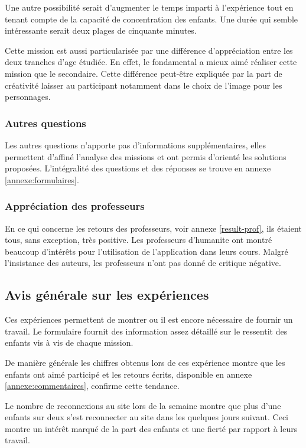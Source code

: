 Une autre possibilité serait d'augmenter le temps imparti à l'expérience tout en tenant compte de la capacité de concentration des enfants. Une durée qui semble intéressante serait deux plages de cinquante minutes.

Cette \gls{mission} est aussi particularisée par une différence d'appréciation entre les deux tranches d'age étudiée. En effet, le \gls{fondamental} a mieux aimé réaliser cette \gls{mission} que le \gls{secondaire}. Cette différence peut-être expliquée par la part de créativité laisser au participant notamment dans le choix de l'image pour les personnages.
\subsubsection{Autres questions}
Les autres questions n'apporte pas d'informations supplémentaires, elles permettent d'affiné l'analyse des missions et ont permis d'orienté les solutions proposées. L'intégralité des questions et des réponses se trouve en annexe \ref{annexe:formulaires}.
\subsubsection{Appréciation des professeurs}
En ce qui concerne les retours des professeurs, voir annexe \ref{result-prof}, ils étaient tous, sans exception, très positive. Les professeurs d'\gls{humanite} ont montré beaucoup d'intérêts pour l'utilisation de l'application dans leurs cours. Malgré l'insistance des auteurs, les professeurs n'ont pas donné de critique négative.


\subsection{Avis générale sur les expériences}
Ces expériences permettent de montrer ou il est encore nécessaire de fournir un travail. Le formulaire fournit des information assez détaillé sur le ressentit des enfants vis à vis de chaque mission.

De manière générale les chiffres obtenus lors de ces expérience montre que les enfants ont aimé participé et les retours écrits, disponible en annexe \ref{annexe:commentaires}, confirme cette tendance. 

Le nombre de reconnexions au site lors de la semaine montre que plus d'une enfants sur deux s'est reconnecter au site dans les quelques jours suivant. Ceci montre un intérêt marqué de la part des enfants et une fierté par rapport à leurs travail.